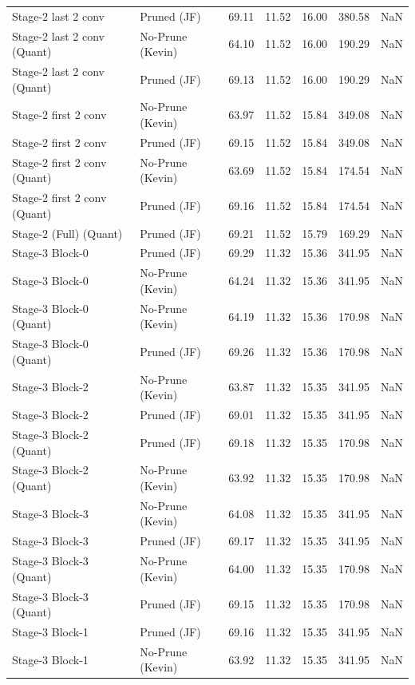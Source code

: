 \begin{table}
\begin{tabular}{llrrrrl}
Stage-2 last 2 conv & Pruned (JF) & 69.11 & 11.52 & 16.00 & 380.58 & NaN \\
Stage-2 last 2 conv
(Quant) & No-Prune (Kevin) & 64.10 & 11.52 & 16.00 & 190.29 & NaN \\
Stage-2 last 2 conv
(Quant) & Pruned (JF) & 69.13 & 11.52 & 16.00 & 190.29 & NaN \\
Stage-2 first 2 conv & No-Prune (Kevin) & 63.97 & 11.52 & 15.84 & 349.08 & NaN \\
Stage-2 first 2 conv & Pruned (JF) & 69.15 & 11.52 & 15.84 & 349.08 & NaN \\
Stage-2 first 2 conv
(Quant) & No-Prune (Kevin) & 63.69 & 11.52 & 15.84 & 174.54 & NaN \\
Stage-2 first 2 conv
(Quant) & Pruned (JF) & 69.16 & 11.52 & 15.84 & 174.54 & NaN \\
Stage-2 (Full)
(Quant) & Pruned (JF) & 69.21 & 11.52 & 15.79 & 169.29 & NaN \\
Stage-3 Block-0 & Pruned (JF) & 69.29 & 11.32 & 15.36 & 341.95 & NaN \\
Stage-3 Block-0 & No-Prune (Kevin) & 64.24 & 11.32 & 15.36 & 341.95 & NaN \\
Stage-3 Block-0
(Quant) & No-Prune (Kevin) & 64.19 & 11.32 & 15.36 & 170.98 & NaN \\
Stage-3 Block-0
(Quant) & Pruned (JF) & 69.26 & 11.32 & 15.36 & 170.98 & NaN \\
Stage-3 Block-2 & No-Prune (Kevin) & 63.87 & 11.32 & 15.35 & 341.95 & NaN \\
Stage-3 Block-2 & Pruned (JF) & 69.01 & 11.32 & 15.35 & 341.95 & NaN \\
Stage-3 Block-2
(Quant) & Pruned (JF) & 69.18 & 11.32 & 15.35 & 170.98 & NaN \\
Stage-3 Block-2
(Quant) & No-Prune (Kevin) & 63.92 & 11.32 & 15.35 & 170.98 & NaN \\
Stage-3 Block-3 & No-Prune (Kevin) & 64.08 & 11.32 & 15.35 & 341.95 & NaN \\
Stage-3 Block-3 & Pruned (JF) & 69.17 & 11.32 & 15.35 & 341.95 & NaN \\
Stage-3 Block-3
(Quant) & No-Prune (Kevin) & 64.00 & 11.32 & 15.35 & 170.98 & NaN \\
Stage-3 Block-3
(Quant) & Pruned (JF) & 69.15 & 11.32 & 15.35 & 170.98 & NaN \\
Stage-3 Block-1 & Pruned (JF) & 69.16 & 11.32 & 15.35 & 341.95 & NaN \\
Stage-3 Block-1 & No-Prune (Kevin) & 63.92 & 11.32 & 15.35 & 341.95 & NaN \\

\end{tabular}
\end{table}
